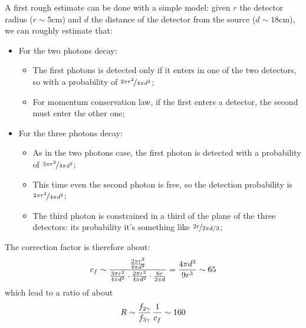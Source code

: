 \documentclass[11pt,a4 paper]{article}
\let\oldfrac\frac
\renewcommand{\frac}[3][d]{\ifthenelse{\equal{#1}{d}}{\oldfrac{#2}{#3}}{\nicefrac{#2}{#3}}}
\begin{document}
A first rough estimate can be done with a simple model: given $r$ the detector radius ($r\sim5\si{\centi\meter}$) and $d$ the distance of the detector from the source ($d\sim18\si{\centi\meter}$), we can roughly estimate that:
\begin{itemize}[noitemsep]
    \item For the two photons decay:
    \begin{itemize}[noitemsep]
        \item The first photons is detected only if it enters in one of the two detectors, so with a probability of $\frac[f]{2\pi r^2}{4\pi d^2}$;
        \item For momentum conservation law, if the first enters a detector, the second must enter the other one;
    \end{itemize}
    \item For the three photons decay:
    \begin{itemize}[noitemsep]
        \item As in the two photons case, the first photon is detected with a probability of $\frac[f]{3 \pi r^2}{4\pi d^2}$;
        \item This time even the second photon is free, so the detection probability is $\frac[f]{2 \pi r^2}{4\pi d^2}$;
        \item The third photon is constrained in a third of the plane of the three detectors: its probability it's something like  $\frac[f]{2r}{2\pi d/3}$;
    \end{itemize}
\end{itemize}
The correction factor is therefore about:
    \begin{equation}
        c_f \sim \frac{\frac{2 \pi r^2}{4\pi d^2}}{\frac{3 \pi r^2}{4\pi d^2}\cdot\frac{2 \pi r^2}{4\pi d^2}\cdot \frac{6r}{2\pi d}} = \frac{4\pi d^3}{9r^3} \sim 65
    \end{equation}
which lead to a ratio of about
\begin{equation}
    R \sim \frac{f_{2\gamma}}{f_{3\gamma}} \,\frac{1}{c_f} \sim 160
\end{equation}


\end{document}
